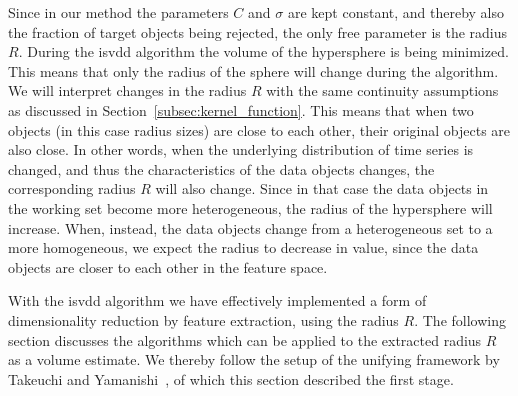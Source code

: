 Since in our method the parameters $C$ and $\sigma$ are kept constant, and thereby also the fraction of target objects being rejected, the only free parameter is the radius $R$.
During the \gls{isvdd} algorithm the volume of the hypersphere is being minimized.
This means that only the radius of the sphere will change during the algorithm.
We will interpret changes in the radius $R$ with the same continuity assumptions as discussed in Section~\ref{subsec:kernel_function}.
This means that when two objects (in this case radius sizes) are close to each other, their original objects are also close.
In other words, when the underlying distribution of time series is changed, and thus the characteristics of the data objects changes, the corresponding radius $R$ will also change.
Since in that case the data objects in the working set become more heterogeneous, the radius of the hypersphere will increase.
When, instead, the data objects change from a heterogeneous set to a more homogeneous, we expect the radius to decrease in value, since the data objects are closer to each other in the feature space.

With the \gls{isvdd} algorithm we have effectively implemented a form of dimensionality reduction by feature extraction, using the radius $R$.
The following section discusses the algorithms which can be applied to the extracted radius $R$ as a volume estimate.
We thereby follow the setup of the unifying framework by Takeuchi and Yamanishi~\cite{takeuchi2006unifying}, of which this section described the first stage.

